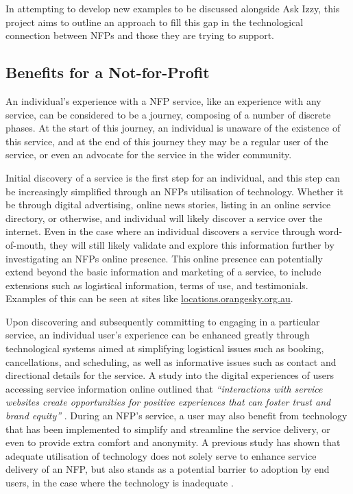 In attempting to develop new examples to be discussed alongside Ask Izzy, this project aims to outline an approach to fill this gap in the technological connection between NFPs and those they are trying to support.

\subsection{Benefits for a Not-for-Profit}

An individual's experience with a NFP service, like an experience with any service, can be considered to be a journey, composing of a number of discrete phases. At the start of this journey, an individual is unaware of the existence of this service, and at the end of this journey they may be a regular user of the service, or even an advocate for the service in the wider community.

Initial discovery of a service is the first step for an individual, and this step can be increasingly simplified through an NFPs utilisation of technology. Whether it be through digital advertising, online news stories, listing in an online service directory, or otherwise, and individual will likely discover a service over the internet. Even in the case where an individual discovers a service through word-of-mouth, they will still likely validate and explore this information further by investigating an NFPs online presence. This online presence can potentially extend beyond the basic information and marketing of a service, to include extensions such as logistical information, terms of use, and testimonials. Examples of this can be seen at sites like \url{locations.orangesky.org.au}.

Upon discovering and subsequently committing to engaging in a particular service, an individual user's experience can be enhanced greatly through technological systems aimed at simplifying logistical issues such as booking, cancellations, and scheduling, as well as informative issues such as contact and directional details for the service. A study into the digital experiences of users accessing service information online outlined that \emph{“interactions with service websites create opportunities for positive experiences that can foster trust and brand equity”} \cite{bilgihan2015applying}. During an NFP's service, a user may also benefit from technology that has been implemented to simplify and streamline the service delivery, or even to provide extra comfort and anonymity. A previous study has shown that adequate utilisation of technology does not solely serve to enhance service delivery of an NFP, but also stands as a potential barrier to adoption by end users, in the case where the technology is inadequate \cite{walker2002technology}.


